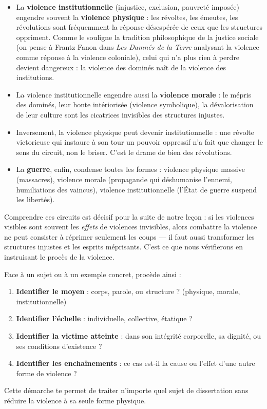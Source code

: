\documentclass[11pt]{article}
\begin{document}
\begin{itemize}
\item La \textbf{violence institutionnelle} (injustice, exclusion, pauvreté imposée) engendre souvent la \textbf{violence physique} : les révoltes, les émeutes, les révolutions sont fréquemment la réponse désespérée de ceux que les structures oppriment. Comme le souligne la tradition philosophique de la justice sociale (on pense à Frantz Fanon dans \emph{Les Damnés de la Terre} analysant la violence comme réponse à la violence coloniale), celui qui n'a plus rien à perdre devient dangereux : la violence des dominés naît de la violence des institutions.
\item La violence institutionnelle engendre aussi la \textbf{violence morale} : le mépris des dominés, leur honte intériorisée (violence symbolique), la dévalorisation de leur culture sont les cicatrices invisibles des structures injustes.
\item Inversement, la violence physique peut devenir institutionnelle : une révolte victorieuse qui instaure à son tour un pouvoir oppressif n'a fait que changer le sens du circuit, non le briser. C'est le drame de bien des révolutions.
\item La \textbf{guerre}, enfin, condense toutes les formes : violence physique massive (massacres), violence morale (propagande qui déshumanise l'ennemi, humiliations des vaincus), violence institutionnelle (l'État de guerre suspend les libertés).
\end{itemize}

Comprendre ces circuits est décisif pour la suite de notre leçon : si les violences visibles sont souvent les \emph{effets} de violences invisibles, alors combattre la violence ne peut consister à réprimer seulement les coups — il faut aussi transformer les structures injustes et les esprits méprisants. C'est ce que nous vérifierons en instruisant le procès de la violence.

\begin{methode}
Face à un sujet ou à un exemple concret, procède ainsi :
\begin{enumerate}
\item \textbf{Identifier le moyen} : corps, parole, ou structure ? (physique, morale, institutionnelle)
\item \textbf{Identifier l'échelle} : individuelle, collective, étatique ?
\item \textbf{Identifier la victime atteinte} : dans son intégrité corporelle, sa dignité, ou ses conditions d'existence ?
\item \textbf{Identifier les enchaînements} : ce cas est-il la cause ou l'effet d'une autre forme de violence ?
\end{enumerate}
Cette démarche te permet de traiter n'importe quel sujet de dissertation sans réduire la violence à sa seule forme physique.
\end{methode}
\end{document}
